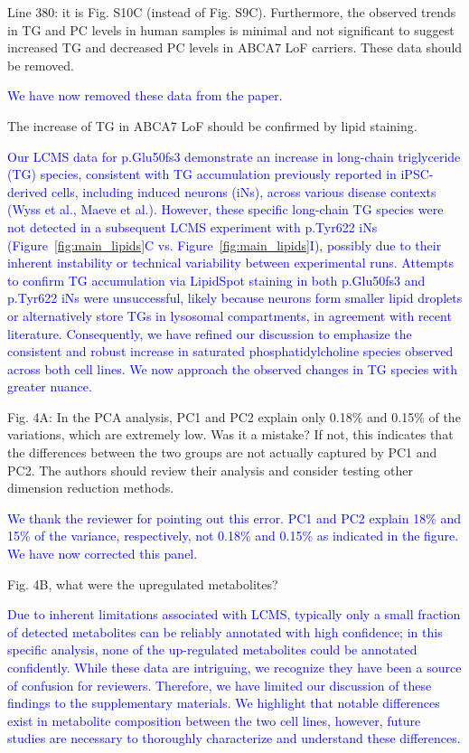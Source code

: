 Line 380: it is Fig. S10C (instead of Fig. S9C). Furthermore, the observed trends in TG and PC levels in human samples is minimal and not significant to suggest increased TG and decreased PC levels in ABCA7 LoF carriers. These data should be removed.
 
\textcolor{blue}{We have now removed these data from the paper.}

The increase of TG in ABCA7 LoF should be confirmed by lipid staining.

\textcolor{blue}{Our LCMS data for p.Glu50fs3 demonstrate an increase in long-chain triglyceride (TG) species, consistent with TG accumulation previously reported in iPSC-derived cells, including induced neurons (iNs), across various disease contexts (Wyss et al., Maeve et al.). However, these specific long-chain TG species were not detected in a subsequent LCMS experiment with p.Tyr622 iNs (Figure~\ref{fig:main_lipids}C vs. Figure~\ref{fig:main_lipids}I), possibly due to their inherent instability or technical variability between experimental runs. Attempts to confirm TG accumulation via LipidSpot staining in both p.Glu50fs3 and p.Tyr622 iNs were unsuccessful, likely because neurons form smaller lipid droplets or alternatively store TGs in lysosomal compartments, in agreement with recent literature. Consequently, we have refined our discussion to emphasize the consistent and robust increase in saturated phosphatidylcholine species observed across both cell lines. We now approach the observed changes in TG species with greater nuance.}

Fig. 4A: In the PCA analysis, PC1 and PC2 explain only 0.18\% and 0.15\% of the variations, which are extremely low. Was it a mistake? If not, this indicates that the differences between the two groups are not actually captured by PC1 and PC2. The authors should review their analysis and consider testing other dimension reduction methods.

\textcolor{blue}{We thank the reviewer for pointing out this error. PC1 and PC2 explain 18\% and 15\% of the variance, respectively, not 0.18\% and 0.15\% as indicated in the figure. We have now corrected this panel.}

Fig. 4B, what were the upregulated metabolites?

\textcolor{blue}{Due to inherent limitations associated with LCMS, typically only a small fraction of detected metabolites can be reliably annotated with high confidence; in this specific analysis, none of the up-regulated metabolites could be annotated confidently. While these data are intriguing, we recognize they have been a source of confusion for reviewers. Therefore, we have limited our discussion of these findings to the supplementary materials. We highlight that notable differences exist in metabolite composition between the two cell lines, however, future studies are necessary to thoroughly characterize and understand these differences.}

